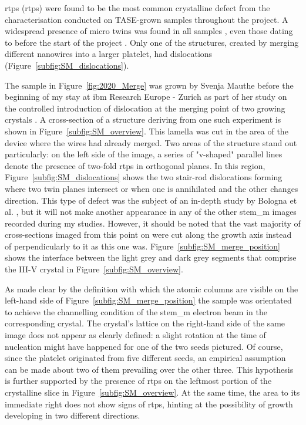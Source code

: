 \Acl{rtp}s (\acs{rtp}s) were found to be the most common crystalline defect from the characterisation conducted on \acs{TASE}-grown samples throughout the project. A widespread presence of micro twins was found in all samples \cite{Brugnolotto2023, Brugnolotto2023_2}, even those dating to before the start of the project \cite{Staudinger2018}. Only one of the structures, created by merging different nanowires into a larger platelet, had dislocations (Figure~\ref{subfig:SM_dislocations}). 

The sample in Figure~\ref{fig:2020_Merge} was grown by Svenja Mauthe before the beginning of my stay at \acs{ibm} Research Europe - Zurich as part of her study on the controlled introduction of dislocation at the merging point of two growing crystals \cite{Mauthe2021}. A cross-section of a structure deriving from one such experiment is shown in Figure~\ref{subfig:SM_overview}. This lamella was cut in the area of the device where the wires had already merged. Two areas of the structure stand out particularly: on the left side of the image, a series of "v-shaped" parallel lines denote the presence of two-fold \acf{rtp}s in orthogonal  planes. In this region, Figure~\ref{subfig:SM_dislocations} shows the two stair-rod dislocations forming where two twin planes intersect or when one is annihilated and the other changes direction. This type of defect was the subject of an in-depth study by Bologna et al. \cite{Bologna2018}, but it will not make another appearance in any of the other \acf{stem_m} images recorded during my studies. However, it should be noted that the vast majority of cross-sections imaged from this point on were cut along the growth axis instead of perpendicularly to it as this one was. Figure~\ref{subfig:SM_merge_position} shows the interface between the light grey and dark grey segments that comprise the III-V crystal in Figure~\ref{subfig:SM_overview}. 

As made clear by the definition with which the atomic columns are visible on the left-hand side of Figure~\ref{subfig:SM_merge_position} the sample was orientated to achieve the channelling condition of the \acs{stem_m} electron beam in the corresponding crystal. The crystal's lattice on the right-hand side of the same image does not appear as clearly defined: a slight rotation at the time of nucleation might have happened for one of the two seeds pictured. Of course, since the platelet originated from five different seeds, an empirical assumption can be made about two of them prevailing over the other three. This hypothesis is further supported by the presence of \acs{rtp}s on the leftmost portion of the crystalline slice in Figure~\ref{subfig:SM_overview}. At the same time, the area to its immediate right does not show signs of \acs{rtp}s, hinting at the possibility of growth developing in two different directions. 

